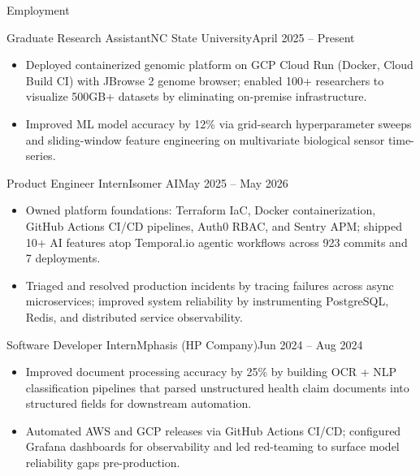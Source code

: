 \documentclass[]{mcdowellcv}
\begin{document}
\makeheader

\begin{cvsection}{Employment}
  \begin{cvsubsection}{Graduate Research Assistant}{NC State University}{April 2025 -- Present}
    \begin{itemize}
      \item Deployed containerized genomic platform on GCP Cloud Run (Docker, Cloud Build CI) with JBrowse 2 genome browser; enabled 100+ researchers to visualize 500GB+ datasets by eliminating on-premise infrastructure.
      \item Improved ML model accuracy by 12\% via grid-search hyperparameter sweeps and sliding-window feature engineering on multivariate biological sensor time-series.
    \end{itemize}
    \vspace{-1.5pt}
  \end{cvsubsection}

  \begin{cvsubsection}{Product Engineer Intern}{Isomer AI}{May 2025 -- May 2026}
    \begin{itemize}
      \item Owned platform foundations: Terraform IaC, Docker containerization, GitHub Actions CI/CD pipelines, Auth0 RBAC, and Sentry APM; shipped 10+ AI features atop Temporal.io agentic workflows across 923 commits and 7 deployments.
      \item Triaged and resolved production incidents by tracing failures across async microservices; improved system reliability by instrumenting PostgreSQL, Redis, and distributed service observability.
    \end{itemize}
    \vspace{-1.5pt}
  \end{cvsubsection}

  \begin{cvsubsection}{Software Developer Intern}{Mphasis (HP Company)}{Jun 2024 -- Aug 2024}
    \begin{itemize}
      \item Improved document processing accuracy by 25\% by building OCR + NLP classification pipelines that parsed unstructured health claim documents into structured fields for downstream automation.
      \item Automated AWS and GCP releases via GitHub Actions CI/CD; configured Grafana dashboards for observability and led red-teaming to surface model reliability gaps pre-production.
    \end{itemize}
    \vspace{-1.5pt}
  \end{cvsubsection}


\end{cvsection}
\end{document}
